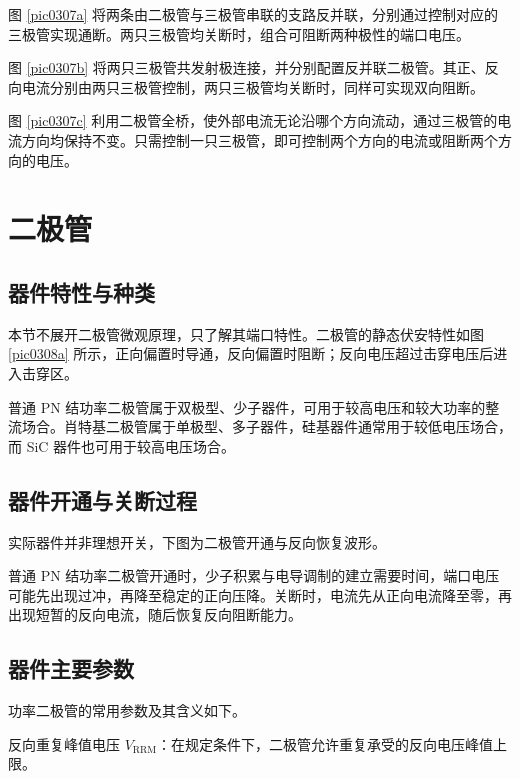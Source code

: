 图 \ref{pic0307a} 将两条由二极管与三极管串联的支路反并联，分别通过控制对应的三极管实现通断。两只三极管均关断时，组合可阻断两种极性的端口电压。

图 \ref{pic0307b} 将两只三极管共发射极连接，并分别配置反并联二极管。其正、反向电流分别由两只三极管控制，两只三极管均关断时，同样可实现双向阻断。

图 \ref{pic0307c} 利用二极管全桥，使外部电流无论沿哪个方向流动，通过三极管的电流方向均保持不变。只需控制一只三极管，即可控制两个方向的电流或阻断两个方向的电压。

\newpage{}

\section{二极管}

\subsection{器件特性与种类}

本节不展开二极管微观原理，只了解其端口特性。二极管的静态伏安特性如图 \ref{pic0308a} 所示，正向偏置时导通，反向偏置时阻断；反向电压超过击穿电压后进入击穿区。


普通 PN 结功率二极管属于双极型、少子器件，可用于较高电压和较大功率的整流场合。肖特基二极管属于单极型、多子器件，硅基器件通常用于较低电压场合，而 SiC 器件也可用于较高电压场合。

\subsection{器件开通与关断过程}

实际器件并非理想开关，下图为二极管开通与反向恢复波形。


普通 PN 结功率二极管开通时，少子积累与电导调制的建立需要时间，端口电压可能先出现过冲，再降至稳定的正向压降。关断时，电流先从正向电流降至零，再出现短暂的反向电流，随后恢复反向阻断能力。

\subsection{器件主要参数}

功率二极管的常用参数及其含义如下。

反向重复峰值电压 $V_{\mathrm{RRM}}$：在规定条件下，二极管允许重复承受的反向电压峰值上限。


